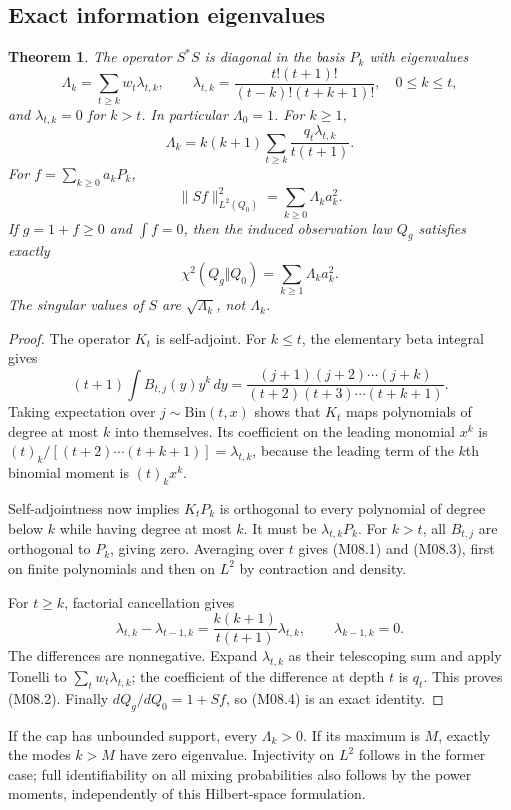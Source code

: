 \documentclass[11pt,a4paper]{article}
\newtheorem{theorem}{Theorem}[section]
\theoremstyle{definition}\newtheorem{definition}[theorem]{Definition}
\theoremstyle{remark}\newtheorem{remark}[theorem]{Remark}
\numberwithin{equation}{section}
\begin{document}
\subsection{Exact information eigenvalues}\label{M08-sec-2}
\begin{theorem}\label{M08-th:diag}
The operator $S^*S$ is diagonal in the basis $P_k$ with eigenvalues
\[
 \Lambda_k=\sum_{t\ge k}w_t\lambda_{t,k},\qquad
 \lambda_{t,k}=\frac{t!(t+1)!}{(t-k)!(t+k+1)!},\quad 0\le k\le t,
\tag{M08.1}
\]
and $\lambda_{t,k}=0$ for $k>t$. In particular $\Lambda_0=1$. For $k\ge1$,
\[
 \boxed{\quad\Lambda_k=k(k+1)\sum_{t\ge k}
              \frac{q_t\lambda_{t,k}}{t(t+1)}.\quad}\tag{M08.2}
\]
For $f=\sum_{k\ge0}a_kP_k$,
\[
 \|Sf\|_{L^2(Q_0)}^2=\sum_{k\ge0}\Lambda_k a_k^2.\tag{M08.3}
\]
If $g=1+f\ge0$ and $\int f=0$, then the induced observation law $Q_g$ satisfies exactly
\[
 \chi^2(Q_g\Vert Q_0)=\sum_{k\ge1}\Lambda_k a_k^2.
\tag{M08.4}
\]
The singular values of $S$ are $\sqrt{\Lambda_k}$, not $\Lambda_k$.
\end{theorem}
\begin{proof}
The operator $K_t$ is self-adjoint. For $k\le t$, the elementary beta integral gives
\[
 (t+1)\int B_{t,j}(y)y^k\,dy
 =\frac{(j+1)(j+2)\cdots(j+k)}{(t+2)(t+3)\cdots(t+k+1)}.
\]
Taking expectation over $j\sim\mathrm{Bin}(t,x)$ shows that $K_t$ maps polynomials of degree at most $k$ into themselves. Its coefficient on the leading monomial $x^k$ is
$(t)_k/[(t+2)\cdots(t+k+1)]=\lambda_{t,k}$, because the leading term of the $k$th binomial moment is $(t)_kx^k$.

Self-adjointness now implies $K_tP_k$ is orthogonal to every polynomial of degree below $k$ while having degree at most $k$. It must be $\lambda_{t,k}P_k$. For $k>t$, all $B_{t,j}$ are orthogonal to $P_k$, giving zero. Averaging over $t$ gives (M08.1) and (M08.3), first on finite polynomials and then on $L^2$ by contraction and density.

For $t\ge k$, factorial cancellation gives
\[
 \lambda_{t,k}-\lambda_{t-1,k}
 =\frac{k(k+1)}{t(t+1)}\lambda_{t,k},\qquad \lambda_{k-1,k}=0.
\]
The differences are nonnegative. Expand $\lambda_{t,k}$ as their telescoping sum and apply Tonelli to $\sum_tw_t\lambda_{t,k}$; the coefficient of the difference at depth $t$ is $q_t$. This proves (M08.2). Finally $dQ_g/dQ_0=1+Sf$, so (M08.4) is an exact identity.
\end{proof}
If the cap has unbounded support, every $\Lambda_k>0$. If its maximum is $M$, exactly the modes $k>M$ have zero eigenvalue. Injectivity on $L^2$ follows in the former case; full identifiability on all mixing probabilities also follows by the power moments, independently of this Hilbert-space formulation.
\end{document}
